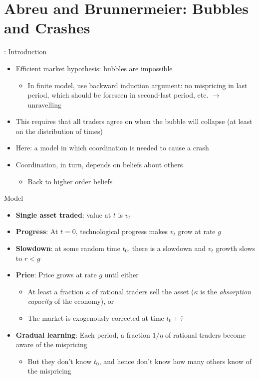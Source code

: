 \documentclass[english,10pt
,aspectratio=169
]{beamer}
\begin{document}
\section{Abreu and Brunnermeier: Bubbles and Crashes}

\begin{frame}{\cite{abreu_bubbles_2003}: Introduction}
	\begin{itemize}
		\item Efficient market hypothesis: bubbles are impossible
		\begin{itemize}
			\item In finite model, use backward induction argument: no mispricing in last period, which should be foreseen in second-last period, etc. $\rightarrow$ unravelling
		\end{itemize}
		\item This requires that all traders agree on when the bubble will collapse (at least on the distribution of times)
		\item Here: a model in which coordination is needed to cause a crash
		\item Coordination, in turn, depends on beliefs about others
		\begin{itemize}
			\item Back to higher order beliefs
		\end{itemize}
	\end{itemize}
\end{frame}


\begin{frame}{Model}
	\begin{itemize}
		\item \textbf{Single asset traded}: value at $t$ is $v_t$
		\item \textbf{Progress}: At $t=0$, technological progress  makes $v_t$ grow at rate $g$
		\item \textbf{Slowdown}: at some random time $t_0$, there is a slowdown and $v_t$ growth slows to $r<g$
		\item \textbf{Price}: Price grows at rate $g$ until either
		\begin{itemize}
			\item At least a fraction $\kappa$ of rational traders sell the asset ($\kappa$ is the \emph{absorption capacity} of the economy), or
			\item The market is exogenously corrected at time $t_0+\overline{\tau}$
		\end{itemize}
		\item \textbf{Gradual learning}: Each period, a fraction $1/\eta$ of rational traders become aware of the mispricing
		\begin{itemize}
			\item But they don't know $t_0$, and hence don't know how many others know of the mispricing
		\end{itemize}
	\end{itemize}
\end{frame}
\end{document}
